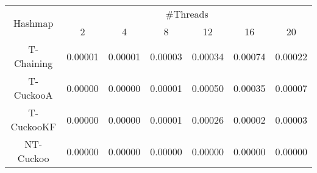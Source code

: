 \begin{tabular}{|c|c|c|c|c|c|c|}
\hline
\multirow{2}{*}{Hashmap} & \multicolumn{6}{c|}{\#Threads}\\\cline{2-7}& 2 & 4 & 8 & 12 & 16 & 20\\
\hline
\hline
T-Chaining & 0.00001 & 0.00001 & 0.00003 & 0.00034 & 0.00074 & 0.00022\\
T-CuckooA & 0.00000 & 0.00000 & 0.00001 & 0.00050 & 0.00035 & 0.00007\\
T-CuckooKF & 0.00000 & 0.00000 & 0.00001 & 0.00026 & 0.00002 & 0.00003\\
NT-Cuckoo & 0.00000 & 0.00000 & 0.00000 & 0.00000 & 0.00000 & 0.00000\\
\hline
\end{tabular}
